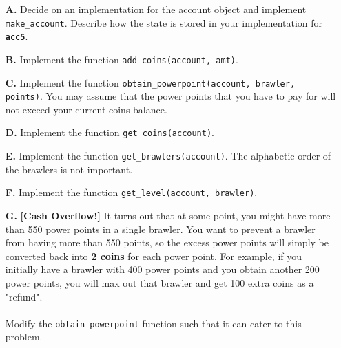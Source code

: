\begin{enumerate}
\item[\textbf{A.}]
Decide on an implementation for the account object and implement \colorbox{CornflowerBlue!20}{\texttt{make\_account}}. 
Describe how the state is stored in your implementation for \texttt{\bfseries acc5}.
\begin{flushright}
    [3 points]
\end{flushright}

\item[\textbf{B.}]
Implement the function \colorbox{CornflowerBlue!20}{\texttt{add\_coins(account, amt)}}.
\begin{flushright}
    [2 points]
\end{flushright}

\item[\textbf{C.}]
Implement the function \colorbox{CornflowerBlue!20}{\texttt{obtain\_powerpoint(account, brawler, points)}}. You may assume that 
the power points that you have to pay for will not exceed your current coins balance.
\begin{flushright}
    [4 points]
\end{flushright}

\item[\textbf{D.}]
Implement the function \colorbox{CornflowerBlue!20}{\texttt{get\_coins(account)}}.
\begin{flushright}
    [2 points]
\end{flushright}

\item[\textbf{E.}]
Implement the function \colorbox{CornflowerBlue!20}{\texttt{get\_brawlers(account)}}. The alphabetic order of the brawlers is not important.
\begin{flushright}
    [3 points]
\end{flushright}

\item[\textbf{F.}]   
Implement the function \colorbox{CornflowerBlue!20}{\texttt{get\_level(account, brawler)}}.
\begin{flushright}
    [3 points]
\end{flushright}

\item[\textbf{G.}]   
\textbf{[Cash Overflow!]} It turns out that at some point, you might have more than 550 power points in a single brawler. 
You want to prevent a brawler from having more than 550 points, so the excess power points will simply be converted back into 
\textbf{2 coins} for each power point. For example, if you initially have a brawler with 400 power points and you obtain another 200 
power points, you will max out that brawler and get 100 extra coins as a "refund". \\ \\
Modify the \colorbox{CornflowerBlue!20}{\texttt{obtain\_powerpoint}} function such that it can cater to this problem.
\begin{flushright}
    [4 points]
\end{flushright}
\end{enumerate}

